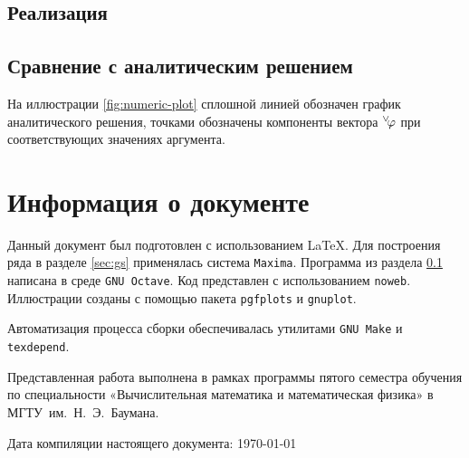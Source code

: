 \documentclass[11pt]{article}
\numberwithin{equation}{section}
\renewcommand{\phi}{\varphi}
\renewcommand{\vec}[1]{{}^{\vee}\negmedspace#1}
\newcommand{\program}[1]{{\tt #1}}
\begin{document}
\clearpage
\subsection{Реализация}
\label{sec:numerical-implementation}



\subsection{Сравнение с аналитическим решением}
\label{sec:comparison}

На иллюстрации \ref{fig:numeric-plot} сплошной линией обозначен график
аналитического решения, точками обозначены компоненты вектора
$\vec{\phi}$ при соответствующих значениях аргумента.



\clearpage
\appendix
\section{Информация о документе}

Данный документ был подготовлен с использованием \LaTeX{}. Для
построения ряда в разделе \ref{sec:gs} применялась система
\program{Maxima}. Программа из раздела
\ref{sec:numerical-implementation} написана в среде
\program{GNU Octave}. Код представлен с использованием
\program{noweb}. Иллюстрации созданы с помощью пакета
\program{pgfplots} и \program{gnuplot}.

Автоматизация процесса сборки обеспечивалась утилитами
\program{GNU Make} и \program{texdepend}.

Представленная работа выполнена в рамках программы пятого семестра
обучения по специальности «Вычислительная математика и математическая
физика» в МГТУ им. Н. Э. Баумана.

Дата компиляции настоящего документа: \today



\end{document}
